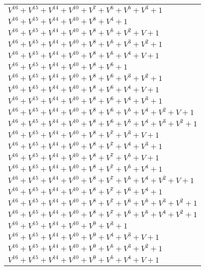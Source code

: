 \documentclass[12pt]{article}
\begin{document}
\begin{adjustwidth}{-4cm}{}
\begin{center}
\begin{longtable}{|l|}
$V^{16}  +V^{15}  +V^{14}  +V^{10}  +V^{7}  +V^{6}  +V^{5}  +V^{3}  + 1$ \\
$V^{16}  +V^{15}  +V^{14}  +V^{10}  +V^{8}  +V^{4}  + 1$ \\
$V^{16}  +V^{15}  +V^{14}  +V^{10}  +V^{8}  +V^{5}  +V^{2}  + V + 1$ \\
$V^{16}  +V^{15}  +V^{14}  +V^{10}  +V^{8}  +V^{5}  +V^{3}  +V^{2}  + 1$ \\
$V^{16}  +V^{15}  +V^{14}  +V^{10}  +V^{8}  +V^{5}  +V^{4}  + V + 1$ \\
$V^{16}  +V^{15}  +V^{14}  +V^{10}  +V^{8}  +V^{6}  + 1$ \\
$V^{16}  +V^{15}  +V^{14}  +V^{10}  +V^{8}  +V^{6}  +V^{3}  +V^{2}  + 1$ \\
$V^{16}  +V^{15}  +V^{14}  +V^{10}  +V^{8}  +V^{6}  +V^{4}  + V + 1$ \\
$V^{16}  +V^{15}  +V^{14}  +V^{10}  +V^{8}  +V^{6}  +V^{4}  +V^{3}  + 1$ \\
$V^{16}  +V^{15}  +V^{14}  +V^{10}  +V^{8}  +V^{6}  +V^{5}  +V^{4}  +V^{2}  + V + 1$ \\
$V^{16}  +V^{15}  +V^{14}  +V^{10}  +V^{8}  +V^{6}  +V^{5}  +V^{4}  +V^{3}  +V^{2}  + 1$ \\
$V^{16}  +V^{15}  +V^{14}  +V^{10}  +V^{8}  +V^{7}  +V^{3}  + V + 1$ \\
$V^{16}  +V^{15}  +V^{14}  +V^{10}  +V^{8}  +V^{7}  +V^{4}  +V^{3}  + 1$ \\
$V^{16}  +V^{15}  +V^{14}  +V^{10}  +V^{8}  +V^{7}  +V^{5}  + V + 1$ \\
$V^{16}  +V^{15}  +V^{14}  +V^{10}  +V^{8}  +V^{7}  +V^{5}  +V^{4}  + 1$ \\
$V^{16}  +V^{15}  +V^{14}  +V^{10}  +V^{8}  +V^{7}  +V^{5}  +V^{4}  +V^{2}  + V + 1$ \\
$V^{16}  +V^{15}  +V^{14}  +V^{10}  +V^{8}  +V^{7}  +V^{6}  +V^{4}  + 1$ \\
$V^{16}  +V^{15}  +V^{14}  +V^{10}  +V^{8}  +V^{7}  +V^{6}  +V^{5}  +V^{3}  +V^{2}  + 1$ \\
$V^{16}  +V^{15}  +V^{14}  +V^{10}  +V^{8}  +V^{7}  +V^{6}  +V^{5}  +V^{4}  +V^{2}  + 1$ \\
$V^{16}  +V^{15}  +V^{14}  +V^{10}  +V^{9}  +V^{3}  + 1$ \\
$V^{16}  +V^{15}  +V^{14}  +V^{10}  +V^{9}  +V^{4}  +V^{3}  + V + 1$ \\
$V^{16}  +V^{15}  +V^{14}  +V^{10}  +V^{9}  +V^{5}  +V^{3}  +V^{2}  + 1$ \\
$V^{16}  +V^{15}  +V^{14}  +V^{10}  +V^{9}  +V^{5}  +V^{4}  + V + 1$ \\

\end{longtable}
\end{center}
\end{adjustwidth}
\end{document}
